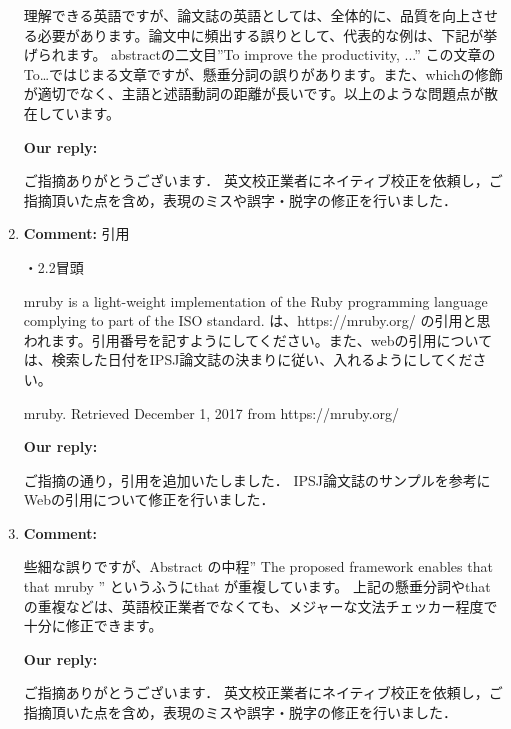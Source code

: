 \documentclass{article}
\begin{document}
\begin{enumerate}
\begin{flushleft}
理解できる英語ですが、論文誌の英語としては、全体的に、品質を向上させる必要があります。論文中に頻出する誤りとして、代表的な例は、下記が挙げられます。
abstractの二文目”To improve the productivity, ...”
この文章のTo…ではじまる文章ですが、懸垂分詞の誤りがあります。また、whichの修飾が適切でなく、主語と述語動詞の距離が長いです。以上のような問題点が散在しています。
\end{flushleft}

\begin{flushleft}
\textbf{Our reply:}

ご指摘ありがとうございます．
英文校正業者にネイティブ校正を依頼し，ご指摘頂いた点を含め，表現のミスや誤字・脱字の修正を行いました．
\end{flushleft}

\item \begin{flushleft}
\textbf{Comment:} 引用

・2.2冒頭

mruby is a light-weight implementation of the Ruby programming language complying to part of the ISO standard.
は、https://mruby.org/
の引用と思われます。引用番号を記すようにしてください。また、webの引用については、検索した日付をIPSJ論文誌の決まりに従い、入れるようにしてください。

mruby. Retrieved December 1, 2017 from https://mruby.org/
\end{flushleft}

\begin{flushleft}
\textbf{Our reply:}

ご指摘の通り，引用を追加いたしました．
IPSJ論文誌のサンプルを参考にWebの引用について修正を行いました．
\end{flushleft}

\item \begin{flushleft}
\textbf{Comment:} 

些細な誤りですが、Abstract の中程” The proposed framework enables that that mruby ” というふうにthat が重複しています。
上記の懸垂分詞やthatの重複などは、英語校正業者でなくても、メジャーな文法チェッカー程度で十分に修正できます。

\end{flushleft}

\begin{flushleft}
\textbf{Our reply:}

ご指摘ありがとうございます．
英文校正業者にネイティブ校正を依頼し，ご指摘頂いた点を含め，表現のミスや誤字・脱字の修正を行いました．
\end{flushleft}

\end{enumerate}
\end{document}
